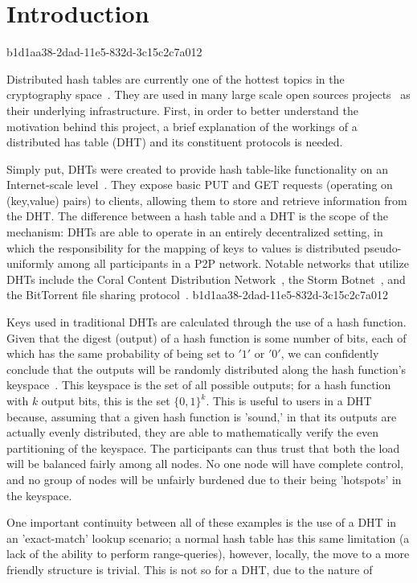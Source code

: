 \documentclass[12pt]{article}
\begin{document}
\section{Introduction}
b1d1aa38-2dad-11e5-832d-3c15c2c7a012\par Distributed hash tables are currently one of the hottest topics in the cryptography space~\cite{Stoica:2001dj,Rowstron:2001ea,Ratnasamy:2001wn}. They are used in many large scale open sources projects~\cite{Freitas:2013tb,Xu:2010vs,Perfitt:2010fh} as their underlying infrastructure. First, in order to better understand the motivation behind this project, a brief explanation of the workings of a distributed has table (DHT) and its constituent protocols is needed.

\par Simply put, DHTs were created to provide hash table-like functionality on an Internet-scale level~\cite{Ratnasamy:2001wn}. They expose basic PUT and GET requests (operating on (key,value) pairs) to clients, allowing them to store and retrieve information from the DHT. The difference between a hash table and a DHT is the scope of the mechanism: DHTs are able to operate in an entirely decentralized setting, in which the responsibility for the mapping of keys to values is distributed pseudo-uniformly among all participants in a P2P network. Notable networks that utilize DHTs include the Coral Content Distribution Network~\cite{Freedman:2004vb}, the Storm Botnet~\cite{Holz:2008uk}, and the BitTorrent file sharing protocol~\cite{Cohen:y1_8mBnw}.
b1d1aa38-2dad-11e5-832d-3c15c2c7a012
\par Keys used in traditional DHTs are calculated through the use of a hash function. Given that the digest (output) of a hash function is some number of bits, each of which has the same probability of being set to $'1'$ or $'0'$, we can confidently conclude that the outputs will be randomly distributed along the hash function's keyspace~. This keyspace is the set of all possible outputs; for a hash function with $k$ output bits, this is the set $\{0,1\}^k$. This is useful to users in a DHT because, assuming that a given hash function is 'sound,' in that its outputs are actually evenly distributed, they are able to mathematically verify the even partitioning of the keyspace. The participants can thus trust that both the load will be balanced fairly among all nodes. No one node will have complete control, and no group of nodes will be unfairly burdened due to their being 'hotspots' in the keyspace.~

\par One important continuity between all of these examples is the use of a DHT in an 'exact-match' lookup scenario; a normal hash table has this same limitation (a lack of the ability to perform range-queries), however, locally, the move to a more friendly structure is trivial. This is not so for a DHT, due to the nature of
\printbibliography
\end{document}
